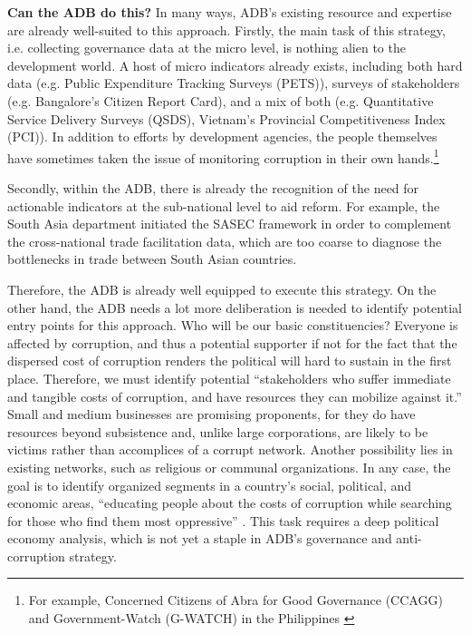 \documentclass[12pt]{article}
\begin{document}
\textbf{Can the ADB do this?} In many ways, ADB's existing resource and expertise are already well-suited to this approach. Firstly, the main task of this strategy, i.e. collecting governance data at the micro level, is nothing alien to the development world. A host of micro indicators already exists, including both hard data (e.g. Public Expenditure Tracking Surveys (PETS)), surveys of stakeholders (e.g. Bangalore's Citizen Report Card), and a mix of both (e.g. Quantitative Service Delivery Surveys (QSDS), Vietnam's Provincial Competitiveness Index (PCI)). In addition to efforts by development agencies, the people themselves have sometimes taken the issue of monitoring corruption in their own hands.\footnote{For example, Concerned Citizens of Abra for Good Governance (CCAGG) and Government-Watch (G-WATCH) in the Philippines \citep{ProcurementWatch2008}}

Secondly, within the ADB, there is already the recognition of the need for actionable indicators at the sub-national level to aid reform. For example, the South Asia department initiated the SASEC framework in order to complement the cross-national trade facilitation data, which are too coarse to diagnose the bottlenecks in trade between South Asian countries.

Therefore, the ADB is already well equipped to execute this strategy. On the other hand, the ADB needs a lot more deliberation is needed to identify potential entry points for this approach. Who will be our basic constituencies? Everyone is affected by corruption, and thus a potential supporter if not for the fact that the dispersed cost of corruption renders the political will hard to sustain in the first place. Therefore, we must identify potential ``stakeholders who suffer immediate and tangible costs of corruption, and have resources they can mobilize against it.'' Small and medium businesses are promising proponents, for they do have resources beyond subsistence and, unlike large corporations, are likely to be victims rather than accomplices of a corrupt network. Another possibility lies in existing networks, such as religious or communal organizations. In any case, the goal is to identify organized segments in a country's social, political, and economic areas, ``educating people about the costs of corruption while searching for those who find them most oppressive'' \citep[7]{Johnston2002}. This task requires a deep political economy analysis, which is not yet a staple in ADB's governance and anti-corruption strategy.

\newpage


\end{document}
